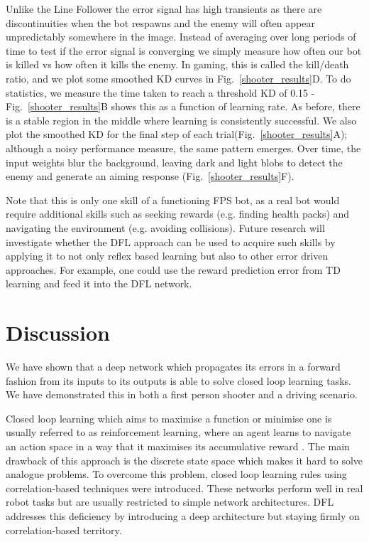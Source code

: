 \documentclass{aamas2018}
\begin{document}
Unlike the Line Follower the error signal has high transients as there
are discontinuities when the bot respawns and the enemy will often
appear unpredictably somewhere in the image. Instead of averaging over
long periods of time to test if the error signal is converging we
simply measure how often our bot is killed vs how often it kills the
enemy. In gaming, this is called the kill/death ratio, and we plot
some smoothed KD curves in Fig.~\ref{shooter_results}D. To do
statistics, we measure the time taken to reach a threshold KD of 0.15
- Fig.~\ref{shooter_results}B shows this as a function of learning
rate. As before, there is a stable region in the middle where learning
is consistently successful. We also plot the smoothed KD for the final
step of each trial(Fig.~\ref{shooter_results}A); although a noisy
performance measure, the same pattern emerges. Over time, the input
weights blur the background, leaving dark and light blobs to detect
the enemy and generate an aiming response
(Fig.~\ref{shooter_results}F).

Note that this is only one skill of a functioning FPS bot, as a real
bot would require additional skills such as seeking rewards
(e.g. finding health packs) and navigating the environment
(e.g. avoiding collisions). Future research will investigate whether
the DFL approach can be used to acquire such skills by applying it to
not only reflex based learning but also to other error driven
approaches. For example, one could use the reward prediction
error from TD learning and feed it into the DFL network.


\section{Discussion}
We have shown that a deep network which propagates its errors in a forward
fashion from its inputs to its outputs is able to solve closed loop
learning tasks. We have demonstrated this in both a first person
shooter and a driving scenario.

Closed loop learning which aims to maximise a function or minimise one
is usually referred to as reinforcement learning, where an agent learns to
navigate an action space in a way that it maximises its accumulative
reward \cite{Dayan1992,Abbott01}. The main drawback of this approach
is the discrete state space which makes it hard to solve analogue
problems. To overcome this problem, closed loop learning rules using
correlation-based techniques \cite{Verschure91} were introduced.
These networks perform well in real robot tasks but are usually restricted to 
simple network architectures. DFL addresses this
deficiency by introducing a deep architecture but staying firmly
on correlation-based territory.
\end{document}
